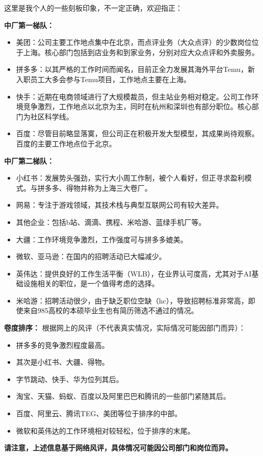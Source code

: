 这里是我个人的一些刻板印象，不一定正确，欢迎指正：


\textbf{中厂第一梯队：}
\begin{itemize}
    \item 美团：公司主要工作地点集中在北京，而点评业务（大众点评）的少数岗位位于上海。核心部门包括到店业务和到家业务，分别对应大众点评和外卖服务。
    \item 拼多多：以其严格的工作时间而闻名，目前正全力发展其海外平台Temu，新入职员工大多会参与Temu项目，工作地点主要在上海。
    \item 快手：近期在电商领域进行了大规模裁员，但主站业务相对稳定。公司工作环境竞争激烈，工作地点以北京为主，同时在杭州和深圳也有部分职位。核心部门为社区科学线。
    \item 百度：尽管目前略显落寞，但公司正在积极开发大型模型，其成果尚待观察。百度的主要工作地点位于北京。
\end{itemize}


\textbf{中厂第二梯队：}

\begin{itemize}
    \item 小红书：发展势头强劲，实行大小周工作制，被个人看好，但正寻求盈利模式。与拼多多、得物并称为上海三大卷厂。
    \item 网易：专注于游戏领域，其技术栈与典型互联网公司有较大差异。
    \item 其他企业：包括b站、滴滴、携程、米哈游、蓝绿手机厂等。
    \item 大疆：工作环境竞争激烈，工作强度可与拼多多媲美。
    \item 微软、亚马逊：在国内的招聘活动已大幅减少。
    \item 英伟达：提供良好的工作生活平衡（WLB），在业界认可度高，尤其对于AI基础设施相关的职位，是一个值得考虑的选择。
    \item 米哈游：招聘活动很少，由于缺乏职位空缺（hc），导致招聘标准非常高，即使来自985高校的本硕毕业生也有简历筛选不通过的情况。
\end{itemize}

\textbf{卷度排序：}
根据网上的风评（不代表真实情况，实际情况可能因部门而异）：

\begin{itemize}
    \item 拼多多的竞争激烈程度最高。
    \item 其次是小红书、大疆、得物。
    \item 字节跳动、快手、华为位列其后。
    \item 淘宝、天猫、蚂蚁、百度以及阿里巴巴和腾讯的一些部门紧随其后。
    \item 百度、阿里云、腾讯TEG、美团等位于排序的中部。
    \item 微软和英伟达的工作环境相对较轻松，位于排序的末尾。
\end{itemize}
\textbf{请注意，上述信息基于网络风评，具体情况可能因公司部门和岗位而异。}

